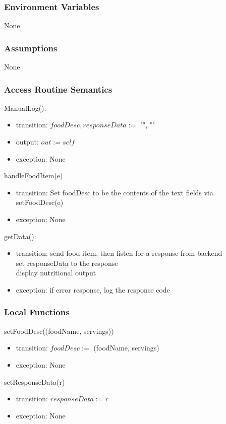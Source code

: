 \documentclass[12pt, titlepage]{article}
\begin{document}
\subsubsection{Environment Variables}
None
\subsubsection{Assumptions}
None
\subsubsection{Access Routine Semantics}
\noindent ManualLog():
\begin{itemize}
	\item transition: $foodDesc, responseData := $ "", ""
	\item output: $out := self$ 
	\item exception: None
\end{itemize}

\noindent handleFoodItem(e)
\begin{itemize}
	\item transition: Set foodDesc to be the contents of the text fields via 
	setFoodDesc(e)
	\item exception: None
\end{itemize}

\noindent
getData():
\begin{itemize}
	\item transition: send food item, then listen for a response from 
	backend\\ set responseData to the response \\ display nutritional output
	\item exception: if error response, log the response code
\end{itemize}

\subsubsection{Local Functions}
\noindent setFoodDesc((foodName, servings))
\begin{itemize}
	\item transition: $ foodDesc := $ (foodName, servings)
	\item exception: None
\end{itemize}
\noindent setResponseData(r)
\begin{itemize}
	\item transition: $ responseData:=r $
	\item exception: None
\end{itemize}
\newpage
\end{document}

